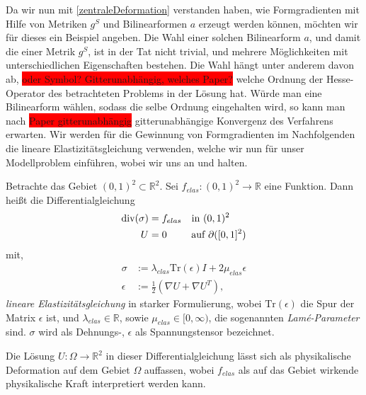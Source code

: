 Da wir nun mit \ref{zentraleDeformation} verstanden haben, wie Formgradienten mit Hilfe von Metriken $g^S$ und Bilinearformen $a$ erzeugt werden können, möchten wir für dieses ein Beispiel angeben. Die Wahl einer solchen Bilinearform $a$, und damit die einer Metrik $g^S$, ist in der Tat nicht trivial, und mehrere Möglichkeiten mit unterschiedlichen Eigenschaften bestehen. Die Wahl hängt unter anderem davon ab,
\colorbox{red}{oder Symbol? Gitterunabhängig, welches Paper?} welche Ordnung der Hesse-Operator des betrachteten Problems in der Lösung hat. Würde man eine Bilinearform wählen, sodass die selbe Ordnung eingehalten wird, so kann man nach \colorbox{red}{Paper gitterunabhängig} gitterunabhängige Konvergenz des Verfahrens erwarten. Wir werden für die Gewinnung von Formgradienten im Nachfolgenden die lineare Elastizitätsgleichung verwenden, welche wir nun für unser Modellproblem einführen, wobei wir uns an \cite{bfgs1} und \cite{bfgs2} halten. 
\newpage
\begin{defi}
	Betrachte das Gebiet $(0,1)^2 \subset \mathbb{R}^2$. Sei $f_{elas}: (0,1)^2 \rightarrow \mathbb{R}$ eine Funktion. Dann heißt die Differentialgleichung
	\begin{equation}\label{linelas}
		\begin{aligned}
		\text{div}(\sigma) &= f_{elas} \quad \text{in } (0,1)^2 \\
		U &= 0 \quad \hspace{0.2cm} \;\;\text{ auf } \partial([0,1]^2)
		\end{aligned}
	\end{equation}	 
	mit,
	\begin{align*}
		\sigma &:= \lambda_{elas} \text{Tr}(\epsilon)I + 2\mu_{elas}\epsilon \\
		\epsilon &:= \frac{1}{2}(\nabla U + \nabla U^T),
	\end{align*}
	\textit{lineare Elastizitätsgleichung} in starker Formulierung, wobei $\text{Tr}(\epsilon)$ die Spur der Matrix $\epsilon$ ist, und $\lambda_{elas} \in \mathbb{R}$, sowie $\mu_{elas} \in [0,\infty)$, die sogenannten \textit{Lamé-Parameter} sind. $\sigma$ wird als Dehnungs-, $\epsilon$ als Spannungstensor bezeichnet. 
\end{defi}

Die Lösung $U: \Omega \rightarrow \mathbb{R}^2$ in dieser Differentialgleichung lässt sich als physikalische Deformation auf dem Gebiet $\Omega$ auffassen, wobei $f_{elas}$ als auf das Gebiet wirkende physikalische Kraft interpretiert werden kann. 

